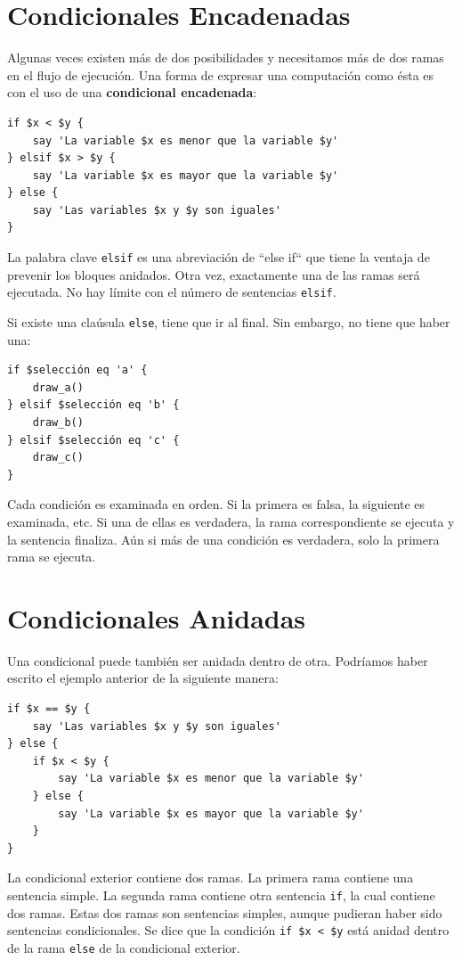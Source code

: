\section{Condicionales Encadenadas}

Algunas veces existen más de dos posibilidades y 
necesitamos más de dos ramas en el flujo de ejecución.
Una forma de expresar una computación como ésta es con
el uso de una {\bf condicional encadenada}:

\begin{verbatim}
if $x < $y {
    say 'La variable $x es menor que la variable $y'
} elsif $x > $y {
    say 'La variable $x es mayor que la variable $y' 
} else {
    say 'Las variables $x y $y son iguales'
}
\end{verbatim}
%
La palabra clave {\tt elsif} es una abreviación de ``else if``
que tiene la ventaja de prevenir los bloques anidados. Otra vez,
exactamente una de las ramas será ejecutada. No hay límite 
con el número de sentencias {\tt elsif}.

Si existe una claúsula {\tt else}, tiene que ir al 
final. Sin embargo, no tiene que haber una:


\begin{verbatim}
if $selección eq 'a' {
    draw_a()
} elsif $selección eq 'b' {
    draw_b()
} elsif $selección eq 'c' {
    draw_c()
}
\end{verbatim}
%
Cada condición es examinada en orden. Si la primera
es falsa, la siguiente es examinada, etc. Si una de ellas
es verdadera, la rama correspondiente se ejecuta y la
sentencia finaliza. Aún si más de una condición es verdadera,
solo la primera rama se ejecuta.


\section{Condicionales Anidadas}

Una condicional puede también ser anidada dentro de otra. Podríamos
haber escrito el ejemplo anterior de la siguiente manera:

\begin{verbatim}
if $x == $y {
    say 'Las variables $x y $y son iguales'
} else {
    if $x < $y {
        say 'La variable $x es menor que la variable $y'
    } else {
        say 'La variable $x es mayor que la variable $y'
    }
}
\end{verbatim}
%
La condicional exterior contiene dos ramas. La primera
rama contiene una sentencia simple. La segunda rama contiene
otra sentencia {\tt if}, la cual contiene dos ramas. Estas 
dos ramas son sentencias simples, aunque pudieran haber sido
sentencias condicionales. Se dice que la condición \verb|if $x < $y| 
está anidad dentro de la rama {\tt else} de la condicional
exterior.

